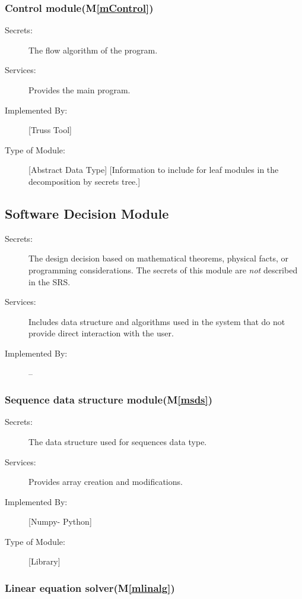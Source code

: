 \documentclass[12pt, titlepage]{article}
\newcommand{\mref}[1]{M\ref{#1}}
\begin{document}
\subsubsection{Control module(\mref{mControl})}

\begin{description}
\item[Secrets:]The flow algorithm of the program.
\item[Services:] Provides the main program.
\item[Implemented By:] [Truss Tool]
\item[Type of Module:] [Abstract Data Type]
  [Information to include for leaf modules in the decomposition by secrets tree.]
\end{description}



\subsection{Software Decision Module}

\begin{description}
\item[Secrets:] The design decision based on mathematical theorems, physical
  facts, or programming considerations. The secrets of this module are
  \emph{not} described in the SRS.
\item[Services:] Includes data structure and algorithms used in the system that
  do not provide direct interaction with the user. 
\item[Implemented By:] --
\end{description}
\subsubsection{Sequence data structure module(\mref{msds})}

\begin{description}
\item[Secrets:]The data structure used for sequences data type.
\item[Services:] Provides array creation and modifications.
\item[Implemented By:] [Numpy- Python]
\item[Type of Module:] [Library]
 
\end{description}
\subsubsection{Linear equation solver(\mref{mlinalg})}
\end{document}
